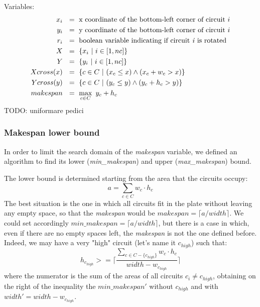     Variables:
    \begin{align}
        x_i\        &\ =\ \text{x coordinate of the bottom-left corner of circuit  } i        \\
        y_i\        &\ =\ \text{y coordinate of the bottom-left corner of circuit  } i        \\
        r_i\        &\ =\ \text{boolean variable indicating if circuit \textit{i} is rotated} 
        \label{eq:rotation_vars}    \\
        X\          &\ =\ \{ x_i\ |\ i \in [1, nc]\}                                          \\
        Y\          &\ =\ \{ y_i\ |\ i \in [1, nc]\}                                          \\
        Xcross(x)\  &\ =\ \{ c \in C\ |\ (x_c \leq x) \land (x_c + w_c > x) \}                \\
        Ycross(y)\  &\ =\ \{ c \in C\ |\ (y_c \leq y) \land (y_c + h_c > y) \}                \\
        makespan\   &\ =\ \max_{c \in C}\ y_c + h_c
    \end{align}
    \colorbox{BurntOrange}{TODO: uniformare pedici}

    \subsubsection{Makespan lower bound}
        In order to limit the search domain of the \textit{makespan} variable, we defined an algorithm to find 
        its lower (\textit{min\_makespan}) and upper (\textit{max\_makespan}) bound.

        The lower bound is determined starting from the area that the circuits occupy: 
        \begin{equation}
            a = \sum_{c \in C} w_c \cdot h_c
        \end{equation}
        The best situation is the one in which all circuits fit in the plate 
        without leaving any empty space, so that the \textit{makespan} would be $makespan = \lceil a / width \rceil$. 
        We could set accordingly $min\_makespan = \lceil a / width \rceil$, but there is a case in which,
        even if there are no empty spaces left, the \textit{makespan} is not the one defined before. 
        Indeed, we may have a very "high" circuit (let's name it $c_{high}$) such that:
        \begin{equation}
            h_{c_{high}} >= \lceil \frac{\sum_{c \in C - \{c_{high}\}} w_c \cdot h_c}{width - w_{c_{high}}} \rceil
            \label{eq:h_high}
        \end{equation}
        where the numerator is the sum of the areas of all circuits $c_i \neq c_{high}$, obtaining on the right of
        the inequality the $min\_makespan'$ without $c_{high}$ and with $width' = width - w_{c_{high}}$.

